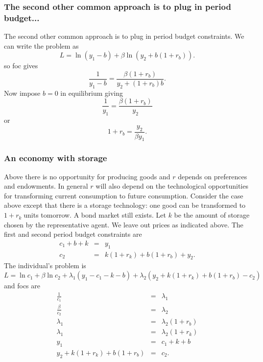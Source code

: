 \documentclass[aspectratio=169]{ltx-talk}
\begin{document}
\begin{frame}
\frametitle{The second other common approach is to plug in period budget...}
The second other common approach is to plug in period budget constraints. We
can write the problem as%
\begin{equation*}
L=\ln \left( y_{1}-b\right) +\beta \ln \left( y_{2}+b\left( 1+r_{b}\right)
\right) .
\end{equation*}%
so foc gives 
\begin{equation*}
\frac{1}{y_{1}-b}=\frac{\beta \left( 1+r_{b}\right) }{y_{2}+\left(
1+r_{b}\right) b}.
\end{equation*}%
Now impose $b=0$ in equilibrium giving 
\begin{equation*}
\frac{1}{y_{1}}=\frac{\beta \left( 1+r_{b}\right) }{y_{2}}
\end{equation*}%
or 
\begin{equation*}
1+r_{b}=\frac{y_{2}}{\beta y_{1}}.
\end{equation*}%
\end{frame}

\begin{frame}
\frametitle{An economy with storage}
Above there is no opportunity for producing goods and $r$ depends on
preferences and endowments. In general $r$ will also depend on the
technological opportunities for transforming current consumption to future
consumption. Consider the case above except that there is a storage
technology: one good can be transformed to $1+r_{k}\;$units tomorrow. A bond
market still exists. Let $k$ be the amount of storage chosen by the
representative agent. We leave out prices as indicated above. The first and
second period budget constraints are 
\begin{eqnarray*}
c_{1}+b+k &=&y_{1} \\
c_{2} &=&k\left( 1+r_{k}\right) +b\left( 1+r_{b}\right) +y_{2}.
\end{eqnarray*}%
The individual's problem is%
\begin{equation*}
L=\ln c_{1}+\beta \ln c_{2}+\lambda _{1}\left( y_{1}-c_{1}-k-b\right)
+\lambda _{2}\left( y_{2}+k\left( 1+r_{k}\right) +b\left( 1+r_{b}\right)
-c_{2}\right)
\end{equation*}%
and focs are 
\begin{eqnarray*}
\frac{1}{c_{1}} &=&\lambda _{1} \\
\frac{\beta }{c_{2}} &=&\lambda _{2} \\
\lambda _{1} &=&\lambda _{2}\left( 1+r_{b}\right) \\
\lambda _{1} &=&\lambda _{2}\left( 1+r_{k}\right) \\
y_{1} &=&c_{1}+k+b \\
y_{2}+k\left( 1+r_{k}\right) +b\left( 1+r_{b}\right) &=&c_{2}.
\end{eqnarray*}
\end{frame}
\end{document}
